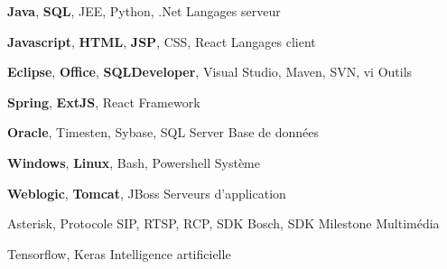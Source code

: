 



\begin{cvhonors}

  \cvhonor
    {} %
    {\textbf{Java}, \textbf{SQL}, JEE, Python, .Net} %
    {} %
    {Langages serveur} %

  \cvhonor
    {} %
    {\textbf{Javascript}, \textbf{HTML}, \textbf{JSP}, CSS, React} %
    {} %
    {Langages client} %

  \cvhonor
    {} %
    {\textbf{Eclipse}, \textbf{Office}, \textbf{SQLDeveloper}, Visual Studio, Maven, SVN, vi} %
    {} %
    {Outils} %

  \cvhonor
    {} %
    {\textbf{Spring}, \textbf{ExtJS},  React} %
    {} %
    {Framework} %
    
  \cvhonor
    {} %
    {\textbf{Oracle}, Timesten, Sybase, SQL Server} %
    {} %
    {Base de données} %

  \cvhonor
    {} %
    {\textbf{Windows}, \textbf{Linux}, Bash, Powershell} %
    {} %
    {Système} %

  \cvhonor
    {} %
    {\textbf{Weblogic}, \textbf{Tomcat}, JBoss} %
    {} %
    {Serveurs d'application} %

  \cvhonor
    {} %
    {Asterisk, Protocole SIP, RTSP, RCP, SDK Bosch, SDK Milestone} %
    {} %
    {Multimédia} %

  \cvhonor
    {} %
    {Tensorflow, Keras} %
    {} %
    {Intelligence artificielle} %
    
\end{cvhonors}




